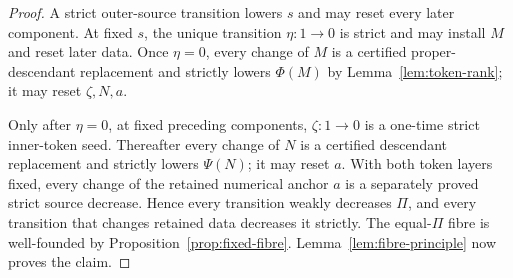 \begin{proof}
A strict outer-source transition lowers $s$ and may reset every later
component.  At fixed $s$, the unique transition $\eta:1\to0$ is strict and
may install $M$ and reset later data.  Once $\eta=0$, every change of $M$ is
a certified proper-descendant replacement and strictly lowers $\Phi(M)$ by
Lemma~\ref{lem:token-rank}; it may reset $\zeta,N,a$.

Only after $\eta=0$, at fixed preceding components, $\zeta:1\to0$ is a
one-time strict inner-token seed.  Thereafter every change of $N$ is a
certified descendant replacement
and strictly lowers $\Psi(N)$; it may reset $a$.  With both token layers
fixed, every change of the retained numerical anchor $a$ is a separately
proved strict source decrease.  Hence every transition weakly decreases
$\Pi$, and every transition that changes retained data decreases it
strictly.  The equal-$\Pi$ fibre is well-founded by
Proposition~\ref{prop:fixed-fibre}.  Lemma~\ref{lem:fibre-principle} now
proves the claim.
\end{proof}


